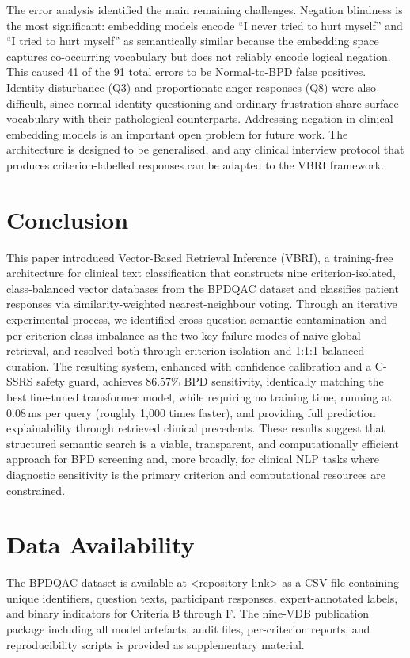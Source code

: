\documentclass[11pt]{article}
\newcommand{\vbri}{VBRI}
\newcommand{\bpdqac}{BPDQAC}
\begin{document}
The error analysis identified the main remaining challenges. Negation blindness is the most
significant: embedding models encode ``I never tried to hurt myself'' and ``I tried to hurt
myself'' as semantically similar because the embedding space captures co-occurring vocabulary but
does not reliably encode logical negation. This caused 41 of the 91 total errors to be
Normal-to-BPD false positives. Identity disturbance (Q3) and proportionate anger responses (Q8)
were also difficult, since normal identity questioning and ordinary frustration share surface
vocabulary with their pathological counterparts. Addressing negation in clinical embedding models
is an important open problem for future work. The architecture is designed to be generalised, and
any clinical interview protocol that produces criterion-labelled responses can be adapted to the
\vbri{} framework.

\section{Conclusion}\label{sec:conclusion}

This paper introduced Vector-Based Retrieval Inference (\vbri{}), a training-free architecture
for clinical text classification that constructs nine criterion-isolated, class-balanced vector
databases from the \bpdqac{} dataset and classifies patient responses via similarity-weighted
nearest-neighbour voting. Through an iterative experimental process, we identified cross-question
semantic contamination and per-criterion class imbalance as the two key failure modes of naive
global retrieval, and resolved both through criterion isolation and 1:1:1 balanced curation. The
resulting system, enhanced with confidence calibration and a C-SSRS safety guard, achieves
86.57\% BPD sensitivity, identically matching the best fine-tuned transformer model, while
requiring no training time, running at 0.08\,ms per query (roughly 1,000 times faster), and
providing full prediction explainability through retrieved clinical precedents. These results
suggest that structured semantic search is a viable, transparent, and computationally efficient
approach for BPD screening and, more broadly, for clinical NLP tasks where diagnostic sensitivity
is the primary criterion and computational resources are constrained.

\section*{Data Availability}

The \bpdqac{} dataset is available at \textless{}repository link\textgreater{} as a CSV file
containing unique identifiers, question texts, participant responses, expert-annotated labels,
and binary indicators for Criteria B through F. The nine-VDB publication package including all
model artefacts, audit files, per-criterion reports, and reproducibility scripts is provided as
supplementary material.

\printbibliography
\end{document}
